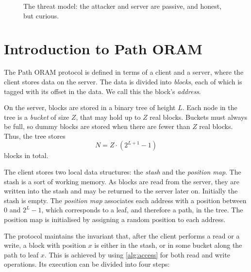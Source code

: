 \documentclass[12pt,a4paper,twoside,openright]{report}
\begin{document}
%

\begin{figure}
    \centering
    \caption{The threat model: the attacker and server are passive, and honest, but curious.}
    \label{fig:threatmodel}
\end{figure}

\section{Introduction to Path ORAM}
\label{sec:oramintro}

The Path ORAM protocol is defined in terms of a client and a server, where the client stores data on the server. The data is divided into \emph{blocks}, each of which is tagged with its offset in the data. We call this the block's \emph{address}.

On the server, blocks are stored in a binary tree of height $L$. Each node in the tree is a \emph{bucket} of size $Z$, that may hold up to $Z$ real blocks. Buckets must always be full, so dummy blocks are stored when there are fewer than $Z$ real blocks. Thus, the tree stores $$N = Z \cdot (2^{L+1} - 1)$$ blocks in total.

The client stores two local data structures: the \emph{stash} and the \emph{position map}. The stash is a sort of working memory. As blocks are read from the server, they are written into the stash and may be returned to the server later on. Initially the stash is empty. The \emph{position map} associates each address with a position between $0$ and $2^L-1$, which corresponds to a leaf, and therefore a path, in the tree. The position map is initialised by assigning a random position to each address.

The protocol maintains the invariant that, after the client performs a read or a write, a block with position $x$ is either in the stash, or in some bucket along the path to leaf $x$. This is achieved by using \cref{alg:access} for both read and write operations. Its execution can be divided into four steps:
\end{document}
